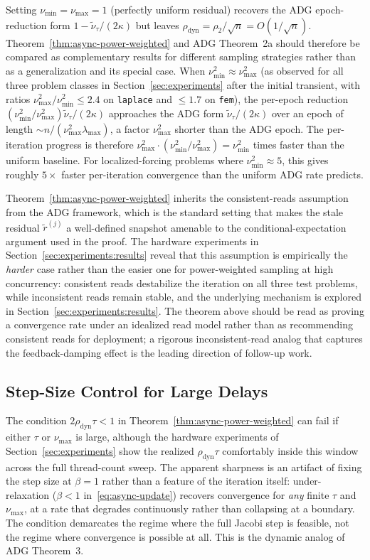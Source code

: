 \documentclass[pdflatex,sn-mathphys-num]{sn-jnl}%
\newcommand{\lmax}{\lambda_{\max}}
\theoremstyle{thmstyleone}%
\theoremstyle{thmstyletwo}%
\theoremstyle{thmstylethree}%
\begin{document}
Setting $\nu_{\min} = \nu_{\max} = 1$ (perfectly uniform residual)
recovers the ADG epoch-reduction form $1 - \tilde\nu_\tau/(2\kappa)$
but leaves $\rho_{\text{dyn}} = \rho_2/\sqrt n = O(1/\sqrt n)$. 
Theorem~\ref{thm:async-power-weighted} and ADG Theorem~2a should
therefore be compared as complementary results for different sampling
strategies rather than as a generalization and its special case.
When $\nu_{\min}^2 \approx \nu_{\max}^2$ (as observed for all three
problem classes in Section~\ref{sec:experiments} after the initial
transient, with ratios $\nu_{\max}^2/\nu_{\min}^2 \leq 2.4$ on
\texttt{laplace} and $\leq 1.7$ on \texttt{fem}), the per-epoch
reduction $(\nu_{\min}^2/\nu_{\max}^2)\tilde\nu_\tau/(2\kappa)$
approaches the ADG form $\tilde\nu_\tau/(2\kappa)$ over an epoch of
length $\sim n/(\nu_{\max}^2\lmax)$, a factor $\nu_{\max}^2$ shorter
than the ADG epoch. The per-iteration progress is therefore
$\nu_{\max}^2 \cdot (\nu_{\min}^2/\nu_{\max}^2) = \nu_{\min}^2$ times
faster than the uniform baseline. For localized-forcing problems where
$\nu_{\min}^2 \approx 5$, this gives roughly $5\times$ faster
per-iteration convergence than the uniform ADG rate predicts.

Theorem~\ref{thm:async-power-weighted} inherits the consistent-reads
assumption from the ADG framework, which is the standard setting that
makes the stale residual $\tilde r^{(j)}$ a well-defined snapshot
amenable to the conditional-expectation argument used in the proof.
The hardware experiments in Section~\ref{sec:experiments:results} reveal
that this assumption is empirically the \emph{harder} case rather than
the easier one for power-weighted sampling at high concurrency:
consistent reads destabilize the iteration on all three test problems,
while inconsistent reads remain stable, and the underlying mechanism is explored in
Section~\ref{sec:experiments:results}. 
The theorem above should be read as proving a convergence rate
under an idealized read model rather than as recommending consistent
reads for deployment; a rigorous inconsistent-read analog that captures
the feedback-damping effect is the leading direction of follow-up work.

\subsection{Step-Size Control for Large Delays}

The condition $2\rho_{\text{dyn}}\tau < 1$ in Theorem~\ref{thm:async-power-weighted}
can fail if either $\tau$ or $\nu_{\max}$ is large, although the hardware
experiments of Section~\ref{sec:experiments} show the realized
$\rho_{\text{dyn}}\tau$ comfortably inside this window across the full
thread-count sweep. The apparent sharpness is an artifact of fixing the
step size at $\beta = 1$ rather than a feature of the iteration itself:
under-relaxation ($\beta < 1$ in~\eqref{eq:async-update}) recovers
convergence for \emph{any} finite $\tau$ and $\nu_{\max}$, at a rate that
degrades continuously rather than collapsing at a boundary. The condition
demarcates the regime where the full Jacobi step is feasible, not the
regime where convergence is possible at all. This is the dynamic analog
of ADG Theorem~3.
\end{document}
